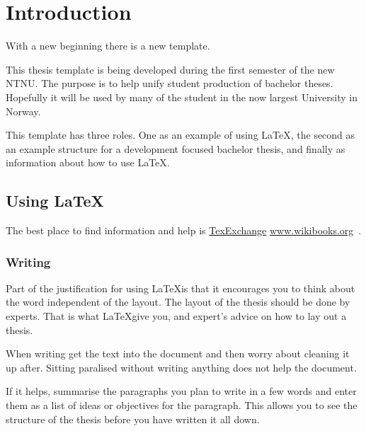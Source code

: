 \chapter{Introduction}
\label{chap:introduction}

With a new beginning there is a new template.  

This thesis template is being developed during the first semester of the new NTNU. The purpose is to help unify student production of bachelor theses.  Hopefully it will be used by many of the student in the now largest University in Norway.

This template has three roles.  One as an example of using \LaTeX, the second as an example structure for a development focused bachelor thesis, and finally as information about how to use \LaTeX.

\section{Using \LaTeX}
The best place to find information and help is \href{http://www.wikibooks.org}{TexExchange} \url{www.wikibooks.org}~\cite{texexchange}.

\subsection{Writing}
Part of the justification for using \LaTeX is that it encourages you to think about the word independent of the layout. The layout of the thesis should be done by experts. That is what \LaTeX give you, and expert's advice on how to lay out a thesis. 

When writing get the text into the document and then worry about cleaning it up after. Sitting paralised without writing anything does not help the document.  

If it helps, summarise the paragraphs you plan to write in a few words and enter them as a list of ideas or objectives for the paragraph.  This allows you to see the structure of the thesis before you have written it all down.





  